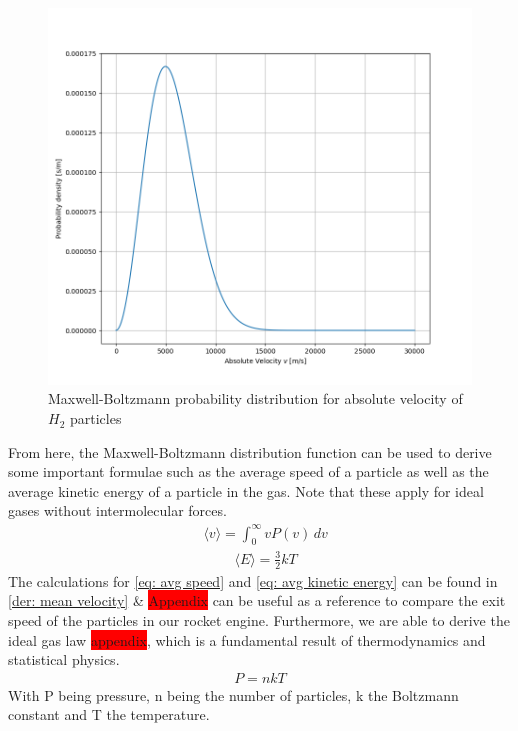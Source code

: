 \documentclass[reprint,english,notitlepage]{revtex4-2}
\begin{document}
\begin{figure}[h]
	\centering
	\includegraphics[scale=0.3]{./Figures/Max-Boltz3}
	\caption{Maxwell-Boltzmann probability distribution for absolute velocity of $H_{2}$ particles}\label{fig:Max_Boltz3D_Plot}
\end{figure}
From here, the Maxwell-Boltzmann distribution function can be used to derive some important formulae such as the average speed of a particle as well as the average kinetic energy of a particle in the gas.
Note that these apply for ideal gases without intermolecular forces.
\begin{align}\label{eq: avg speed}
    &\langle v \rangle = \int_{0}^{\infty} vP(v)\,dv  
\end{align}
\begin{align}\label{eq: avg kinetic energy}
	&\langle E \rangle = \frac{3}{2}kT
\end{align}
The calculations for \ref{eq: avg speed} and \ref{eq: avg kinetic energy} can be found in \ref{der: mean velocity} \& \colorbox{red}{Appendix} can be useful as a reference to compare the exit speed of the particles in our rocket engine.
Furthermore, we are able to derive the ideal gas law \colorbox{red}{appendix}, which is a fundamental result of thermodynamics and statistical physics.
\begin{align*}
    P = nkT
\end{align*}
With P being pressure, n being the number of particles, k the Boltzmann constant and T the temperature.\\
\end{document}
